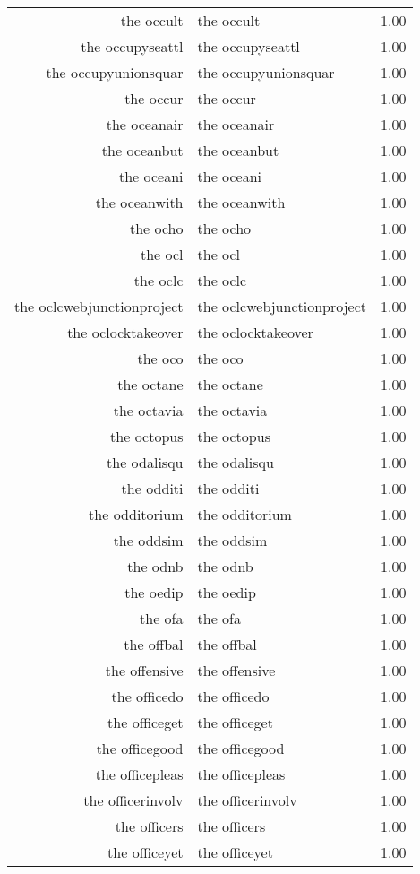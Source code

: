 \begin{table}[ht]
\begin{tabular}{rlr}
  the occult & the occult & 1.00 \\ 
  the occupyseattl & the occupyseattl & 1.00 \\ 
  the occupyunionsquar & the occupyunionsquar & 1.00 \\ 
  the occur & the occur & 1.00 \\ 
  the oceanair & the oceanair & 1.00 \\ 
  the oceanbut & the oceanbut & 1.00 \\ 
  the oceani & the oceani & 1.00 \\ 
  the oceanwith & the oceanwith & 1.00 \\ 
  the ocho & the ocho & 1.00 \\ 
  the ocl & the ocl & 1.00 \\ 
  the oclc & the oclc & 1.00 \\ 
  the oclcwebjunctionproject & the oclcwebjunctionproject & 1.00 \\ 
  the oclocktakeover & the oclocktakeover & 1.00 \\ 
  the oco & the oco & 1.00 \\ 
  the octane & the octane & 1.00 \\ 
  the octavia & the octavia & 1.00 \\ 
  the octopus & the octopus & 1.00 \\ 
  the odalisqu & the odalisqu & 1.00 \\ 
  the odditi & the odditi & 1.00 \\ 
  the odditorium & the odditorium & 1.00 \\ 
  the oddsim & the oddsim & 1.00 \\ 
  the odnb & the odnb & 1.00 \\ 
  the oedip & the oedip & 1.00 \\ 
  the ofa & the ofa & 1.00 \\ 
  the offbal & the offbal & 1.00 \\ 
  the offensive & the offensive & 1.00 \\ 
  the officedo & the officedo & 1.00 \\ 
  the officeget & the officeget & 1.00 \\ 
  the officegood & the officegood & 1.00 \\ 
  the officepleas & the officepleas & 1.00 \\ 
  the officerinvolv & the officerinvolv & 1.00 \\ 
  the officers & the officers & 1.00 \\ 
  the officeyet & the officeyet & 1.00 \\ 

\end{tabular}
\end{table}
